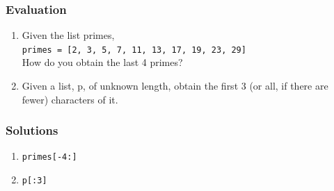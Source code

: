 \documentclass[17pt]{beamer}
\newcounter{saveenumi}
\newcommand{\seti}{\setcounter{saveenumi}{\value{enumi}}}
\begin{document}
\begin{frame}
\frametitle{Evaluation}
\label{sec-10.1}

\begin{enumerate}
\item Given the list primes,\\ \texttt{primes = [2, 3, 5, 7, 11, 13, 17, 19, 23,
   29]} \pause\\ How do you obtain the last 4 primes? \pause
\vspace{11pt}   
\item Given a list, p, of unknown length, obtain the first 3 (or all, if
   there are fewer) characters of it.
\seti
\end{enumerate}
\end{frame}


\begin{frame}
\frametitle{Solutions}
\label{sec-11}


\begin{enumerate}
\item \texttt{primes[-4:]}\pause
\vspace{8pt}
\item \texttt{p[:3]}\pause
\vspace{8pt}
\end{enumerate}
\end{frame}
\end{document}
